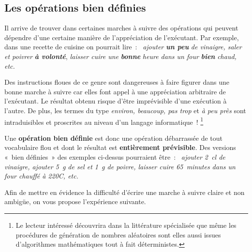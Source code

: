 		\subsection{Les opérations bien définies}
		
			Il arrive de trouver dans certaines marches à suivre 
			des opérations qui peuvent dépendre d’une certaine manière 
			de l’appréciation de l’exécutant. 
			Par exemple, dans une recette de cuisine on pourrait lire~:~
			\textit{ajouter} \textbf{\textit{un peu}} 
			\textit{de vinaigre, saler et poivrer} 
			\textbf{\textit{à volonté}}, \textit{laisser cuire une} 
			\textbf{\textit{bonne}}
			\textit{ heure dans un four}
			\textbf{\textit{bien}} \textit{chaud, etc.}
			
			Des instructions floues de ce genre 
			sont dangereuses à faire figurer dans une bonne marche à suivre 
			car elles font appel à une appréciation arbitraire de l’exécutant. 
			Le résultat obtenu risque d’être imprévisible 
			d’une exécution à l’autre. 
			De plus, les termes du type \textit{environ, beaucoup, pas trop} 
			et \textit{à peu près} sont intraduisibles 
			et proscrites au niveau d’un langage informatique~!%
			\footnote{%
				Le lecteur intéressé découvrira 
				dans la littérature spécialisée 
				que même les procédures de génération de nombres aléatoires
				sont elles aussi issues d’algorithmes mathématiques 
				tout à fait déterministes.
			}
			
			Une \textbf{opération bien définie} 
			est donc une opération débarrassée
			de tout vocabulaire flou 
			et dont le résultat est \textbf{entièrement prévisible}. 
			Des versions «~bien définies~» des exemples ci-dessus
			pourraient être~:~
			\textit{ajouter 2~cl de vinaigre, ajouter 5~g de sel
			et 1~g de poivre, 
			laisser cuire 65~minutes dans un four chauffé à 220\degre{}C, etc.}
	
			Afin de mettre en évidence la difficulté d’écrire une
			marche à suivre claire et non ambigüe, on vous propose
			l’expérience suivante.
	

